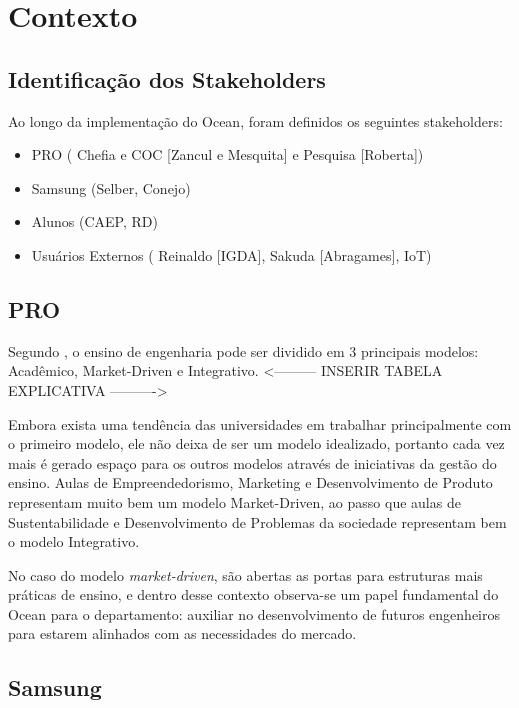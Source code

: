 \chapter{Contexto}
\label{cha:contexto}

\section{Identificação dos Stakeholders}
\label{sec:identificacao_stakeholders}

Ao longo da implementação do Ocean, foram definidos os seguintes stakeholders:

\begin{itemize}
\item PRO ( Chefia e COC [Zancul e Mesquita] e Pesquisa [Roberta])
\item Samsung (Selber, Conejo)
\item Alunos (CAEP, RD)
\item Usuários Externos ( Reinaldo [IGDA], Sakuda [Abragames], IoT)
\end{itemize}

\section{PRO}
\label{sec:con_pro}

Segundo , o ensino de engenharia pode ser dividido em 3 principais modelos: Acadêmico, Market-Driven e Integrativo. <--------- INSERIR TABELA EXPLICATIVA ---------->

Embora exista uma tendência das universidades em trabalhar principalmente com o primeiro modelo, ele não deixa de ser um modelo idealizado, portanto cada vez mais é gerado espaço para os outros modelos através de iniciativas da gestão do ensino. Aulas de Empreendedorismo, Marketing e Desenvolvimento de Produto representam muito bem um modelo Market-Driven, ao passo que aulas de Sustentabilidade e Desenvolvimento de Problemas da sociedade representam bem o modelo Integrativo.

No caso do modelo \textit{market-driven}, são abertas as portas para estruturas mais práticas de ensino, e dentro desse contexto observa-se um papel fundamental do Ocean para o departamento: auxiliar no desenvolvimento de futuros engenheiros para estarem alinhados com as necessidades do mercado. 

\section{Samsung}
\label{sec:con_samsung}

